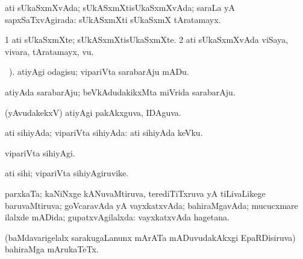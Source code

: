 \bentry
{}
\gl{\gu}
\bmng
ati sUkaSxmXvAda; sUkASxmXtisUkaSxmXvAda; saraLa yA sapxSaTxvAgirada:  sUkASxmXti sUkaSxmX tAratamayx. 
\emng
\eentry

\bentry
{}
\gl{\nA}
\bmng
\bnum
\num{1} ati sUkaSxmXte; sUkASxmXtisUkaSxmXte. 
\num{2} ati sUkaSxmXvAda viSaya, vivara, tAratamayx, \mo vu. 
\enum
\emng
\eentry

\bentry
{}
\gl{\sakirx}
\BUkaq\ ).\bmng
atiyAgi odagisu; vipariVta sarabarAju mADu. 
\emng
\eentry

\bentry
{}
\gl{\nA}
\bmng
atiyAda sarabarAju; beVkAdudakikxMta miVrida sarabarAju. 
\emng
\eentry

\bentry
{}
\gl{\gu}
\bmng
(yAvudakekxV) atiyAgi pakAkxguva, IDAguva. 
\emng
\eentry

\bentry
{}
\gl{\gu}
\bmng
ati sihiyAda; vipariVta sihiyAda:  ati sihiyAda keVku. 
\emng
\eentry

\bentry
{}
\gl{\kirxvi}
\bmng
vipariVta sihiyAgi. 
\emng
\eentry

\bentry
{}
\gl{\nA}
\bmng
ati sihi; vipariVta sihiyAgiruvike. 
\emng
\eentry

\bentry
{}
\gl{\gu}
\bmng
parxkaTa; kaNiNxge kANuvaMtiruva, terediTiTxruva yA tiLivaLikege baruvaMtiruva; goVcaravAda yA vayxkatxvAda; bahiraMgavAda; mucucxmare ilalxde mADida; gupatxvAgilalxda:  vayxkatxvAda hagetana. 
\emng

\noindent
\gl{\pagu}
\bmng
{} (baMdavarigelalx sarakugaLanunx mArATa mADuvudakAkxgi EpaRDisiruva) bahiraMga mArukaTeTx. 
\emng
\eentry

